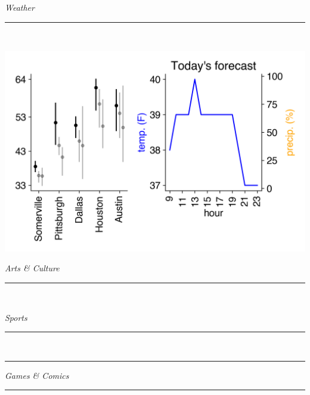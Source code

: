 \documentclass[landscape]{article}
\date{\today}
\renewcommand\headline[1]{\begin{center} {\huge \textsl{ #1}}\\ %
			\rule[5pt]{0.8\hsize}{0.5pt}\\ \end{center}}
\begin{document}
\maketitle

\begin{multicols}{3}
\headline{Weather}
\vspace{-0.5cm}\includegraphics[width=\linewidth]{images/weather.png}

\headline{Arts \& Culture}
\vspace{-0.3cm}


\noindent

\headline{Sports}
\vspace{-0.3cm}


\begin{center}
	
\end{center}
\hrule
\begin{center}
	
\end{center}

\headline{Games \& Comics}
\vspace{-0.3cm}

% 


\end{multicols}
\end{document}
